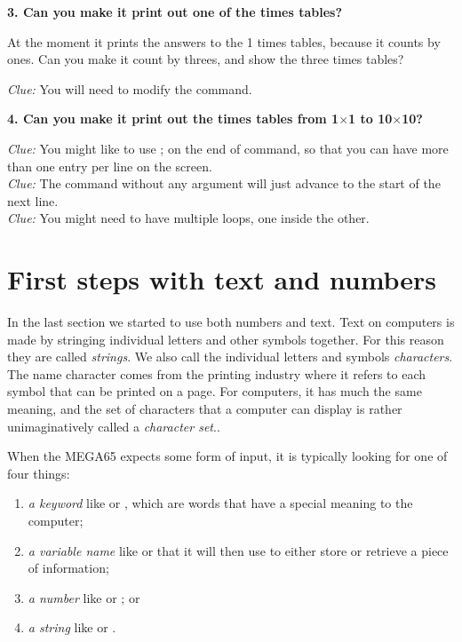  {\bf 3. Can you make it print out one of the times tables?}

  At the moment it prints the answers to the 1 times tables, because it counts by ones.
  Can you make it count by threes, and show the three times tables?

  {\em Clue:} You will need to modify the  command.

  {\bf 4. Can you make it print out the times tables from 1$\times$1 to 10$\times$10?}

  {\em Clue:} You might like to use ; on the end of  command, so that you can have
  more than one entry per line on the screen.\\
  {\em Clue:} The  command without any argument will just advance to the start of the next line.\\
  {\em Clue:} You might need to have multiple  loops, one inside the other.

\section{First steps with text and numbers}

In the last section we started to use both numbers and text.  Text on computers is made by stringing individual letters
and other symbols together.  For this reason they are called {\em strings}.  We also call the individual letters and
symbols {\em characters}.  The name character comes from the printing industry where it refers to each symbol that can be
printed on a page. For computers, it has much the same meaning, and the set of characters that a computer can display
is rather unimaginatively called a {\em character set}..

When the MEGA65 expects some form of input, it is typically looking for one of four things:

\begin{enumerate}
\item {\em a keyword} like  or , which are words that have a special meaning to the computer;
\item {\em a variable name} like  or  that it will then use to either store or retrieve a piece of information;
\item {\em a number} like  or ; or
\item {\em a string} like  or .
\end{enumerate}

